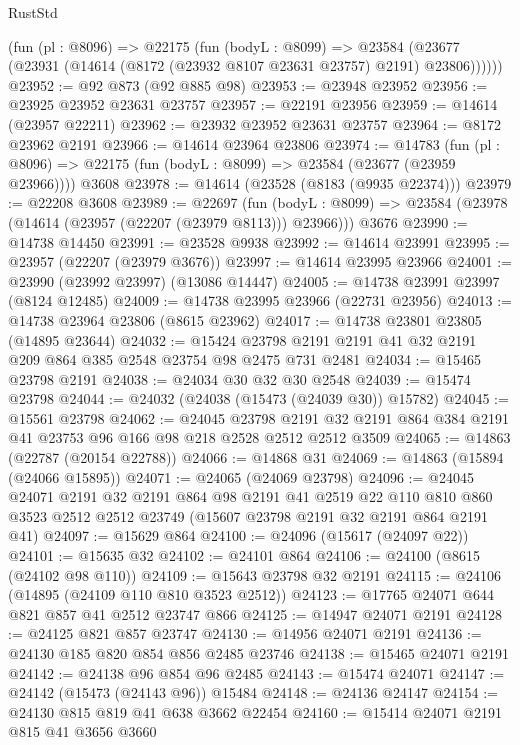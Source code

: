 \begin{lexlean}{RustStd}
\begin{coremodule}
      (fun (pl : @8096) =>
      @22175
        (fun (bodyL : @8099) =>
        @23584 (@23677 (@23931 (@14614 (@8172 (@23932 @8107 @23631 @23757) @2191) @23806))))))
@23952 := @92 @873 (@92 @885 @98)
@23953 := @23948 @23952
@23956 := @23925 @23952 @23631 @23757
@23957 := @22191 @23956
@23959 := @14614 (@23957 @22211)
@23962 := @23932 @23952 @23631 @23757
@23964 := @8172 @23962 @2191
@23966 := @14614 @23964 @23806
@23974 := @14783
    (fun (pl : @8096) => @22175 (fun (bodyL : @8099) => @23584 (@23677 (@23959 @23966))))
    @3608
@23978 := @14614 (@23528 (@8183 (@9935 @22374)))
@23979 := @22208 @3608
@23989 := @22697
    (fun (bodyL : @8099) => @23584 (@23978 (@14614 (@23957 (@22207 (@23979 @8113))) @23966)))
    @3676
@23990 := @14738 @14450
@23991 := @23528 @9938
@23992 := @14614 @23991
@23995 := @23957 (@22207 (@23979 @3676))
@23997 := @14614 @23995 @23966
@24001 := @23990 (@23992 @23997) (@13086 @14447)
@24005 := @14738 @23991 @23997 (@8124 @12485)
@24009 := @14738 @23995 @23966 (@22731 @23956)
@24013 := @14738 @23964 @23806 (@8615 @23962)
@24017 := @14738 @23801 @23805 (@14895 @23644)
@24032 := @15424 @23798 @2191 @2191 @41 @32 @2191 @209 @864 @385 @2548 @23754 @98 @2475 @731 @2481
@24034 := @15465 @23798 @2191
@24038 := @24034 @30 @32 @30 @2548
@24039 := @15474 @23798
@24044 := @24032 (@24038 (@15473 (@24039 @30)) @15782)
@24045 := @15561 @23798
@24062 := @24045
    @23798
    @2191
    @32
    @2191
    @864
    @384
    @2191
    @41
    @23753
    @96
    @166
    @98
    @218
    @2528
    @2512
    @2512
    @3509
@24065 := @14863 (@22787 (@20154 @22788))
@24066 := @14868 @31
@24069 := @14863 (@15894 (@24066 @15895))
@24071 := @24065 (@24069 @23798)
@24096 := @24045
    @24071
    @2191
    @32
    @2191
    @864
    @98
    @2191
    @41
    @2519
    @22
    @110
    @810
    @860
    @3523
    @2512
    @2512
    @23749
    (@15607 @23798 @2191 @32 @2191 @864 @2191 @41)
@24097 := @15629 @864
@24100 := @24096 (@15617 (@24097 @22))
@24101 := @15635 @32
@24102 := @24101 @864
@24106 := @24100 (@8615 (@24102 @98 @110))
@24109 := @15643 @23798 @32 @2191
@24115 := @24106 (@14895 (@24109 @110 @810 @3523 @2512))
@24123 := @17765 @24071 @644 @821 @857 @41 @2512 @23747 @866
@24125 := @14947 @24071 @2191
@24128 := @24125 @821 @857 @23747
@24130 := @14956 @24071 @2191
@24136 := @24130 @185 @820 @854 @856 @2485 @23746
@24138 := @15465 @24071 @2191
@24142 := @24138 @96 @854 @96 @2485
@24143 := @15474 @24071
@24147 := @24142 (@15473 (@24143 @96)) @15484
@24148 := @24136 @24147
@24154 := @24130 @815 @819 @41 @638 @3662 @22454
@24160 := @15414 @24071 @2191 @815 @41 @3656 @3660

\end{coremodule}
\end{lexlean}
